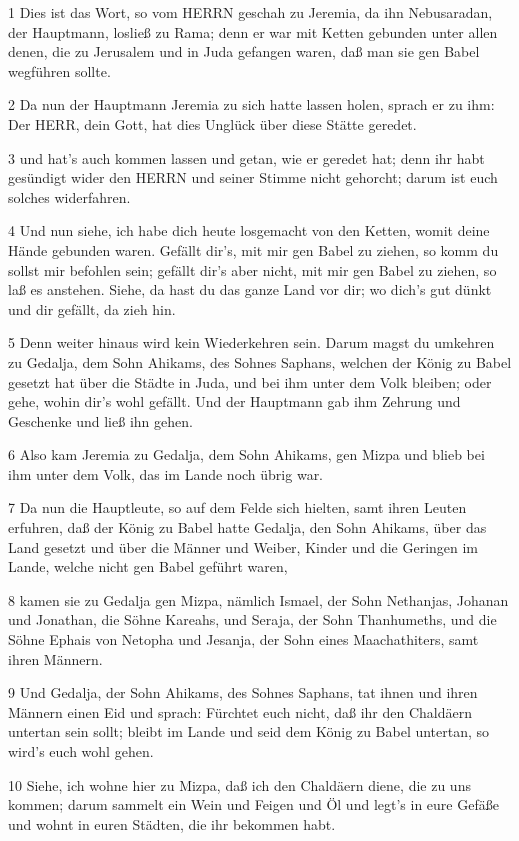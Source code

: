 \par 1 Dies ist das Wort, so vom HERRN geschah zu Jeremia, da ihn Nebusaradan, der Hauptmann, losließ zu Rama; denn er war mit Ketten gebunden unter allen denen, die zu Jerusalem und in Juda gefangen waren, daß man sie gen Babel wegführen sollte.
\par 2 Da nun der Hauptmann Jeremia zu sich hatte lassen holen, sprach er zu ihm: Der HERR, dein Gott, hat dies Unglück über diese Stätte geredet.
\par 3 und hat's auch kommen lassen und getan, wie er geredet hat; denn ihr habt gesündigt wider den HERRN und seiner Stimme nicht gehorcht; darum ist euch solches widerfahren.
\par 4 Und nun siehe, ich habe dich heute losgemacht von den Ketten, womit deine Hände gebunden waren. Gefällt dir's, mit mir gen Babel zu ziehen, so komm du sollst mir befohlen sein; gefällt dir's aber nicht, mit mir gen Babel zu ziehen, so laß es anstehen. Siehe, da hast du das ganze Land vor dir; wo dich's gut dünkt und dir gefällt, da zieh hin.
\par 5 Denn weiter hinaus wird kein Wiederkehren sein. Darum magst du umkehren zu Gedalja, dem Sohn Ahikams, des Sohnes Saphans, welchen der König zu Babel gesetzt hat über die Städte in Juda, und bei ihm unter dem Volk bleiben; oder gehe, wohin dir's wohl gefällt. Und der Hauptmann gab ihm Zehrung und Geschenke und ließ ihn gehen.
\par 6 Also kam Jeremia zu Gedalja, dem Sohn Ahikams, gen Mizpa und blieb bei ihm unter dem Volk, das im Lande noch übrig war.
\par 7 Da nun die Hauptleute, so auf dem Felde sich hielten, samt ihren Leuten erfuhren, daß der König zu Babel hatte Gedalja, den Sohn Ahikams, über das Land gesetzt und über die Männer und Weiber, Kinder und die Geringen im Lande, welche nicht gen Babel geführt waren,
\par 8 kamen sie zu Gedalja gen Mizpa, nämlich Ismael, der Sohn Nethanjas, Johanan und Jonathan, die Söhne Kareahs, und Seraja, der Sohn Thanhumeths, und die Söhne Ephais von Netopha und Jesanja, der Sohn eines Maachathiters, samt ihren Männern.
\par 9 Und Gedalja, der Sohn Ahikams, des Sohnes Saphans, tat ihnen und ihren Männern einen Eid und sprach: Fürchtet euch nicht, daß ihr den Chaldäern untertan sein sollt; bleibt im Lande und seid dem König zu Babel untertan, so wird's euch wohl gehen.
\par 10 Siehe, ich wohne hier zu Mizpa, daß ich den Chaldäern diene, die zu uns kommen; darum sammelt ein Wein und Feigen und Öl und legt's in eure Gefäße und wohnt in euren Städten, die ihr bekommen habt.
